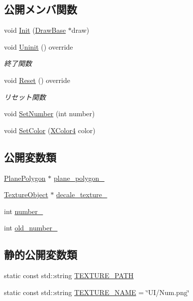\subsection*{公開メンバ関数}
\begin{DoxyCompactItemize}
\item 
void \mbox{\hyperlink{class_number_ad92c9038810d0f831fdb9b5b13901b79}{Init}} (\mbox{\hyperlink{class_draw_base}{Draw\+Base}} $\ast$draw)
\item 
void \mbox{\hyperlink{class_number_a7c3bf9c55f7a0a19d80129c5f07f99f2}{Uninit}} () override
\begin{DoxyCompactList}\small\item\em 終了関数 \end{DoxyCompactList}\item 
void \mbox{\hyperlink{class_number_a7c6facdb1b3d0acc8309e0a915863d44}{Reset}} () override
\begin{DoxyCompactList}\small\item\em リセット関数 \end{DoxyCompactList}\item 
void \mbox{\hyperlink{class_number_ac825b1ee1f46a6ac4ffd3bc904964745}{Set\+Number}} (int number)
\item 
void \mbox{\hyperlink{class_number_a1ea98cdee888a040f4530a6654657c44}{Set\+Color}} (\mbox{\hyperlink{_vector3_d_8h_a680c30c4a07d86fe763c7e01169cd6cc}{X\+Color4}} color)
\end{DoxyCompactItemize}
\subsection*{公開変数類}
\begin{DoxyCompactItemize}
\item 
\mbox{\hyperlink{class_plane_polygon}{Plane\+Polygon}} $\ast$ \mbox{\hyperlink{class_number_a588084d69c46b02ddb608448724cfe11}{plane\+\_\+polygon\+\_\+}}
\item 
\mbox{\hyperlink{class_texture_object}{Texture\+Object}} $\ast$ \mbox{\hyperlink{class_number_a305385aaec293089117c50fd1cf2575f}{decale\+\_\+texture\+\_\+}}
\item 
int \mbox{\hyperlink{class_number_a8c3235a3442303d4ef950fef5eb7b34c}{number\+\_\+}}
\item 
int \mbox{\hyperlink{class_number_acd5422010e99cbf61196094a9b501115}{old\+\_\+number\+\_\+}}
\end{DoxyCompactItemize}
\subsection*{静的公開変数類}
\begin{DoxyCompactItemize}
\item 
static const std\+::string \mbox{\hyperlink{class_number_a0018ed63d70f4dde3c64bf99df7978ce}{T\+E\+X\+T\+U\+R\+E\+\_\+\+P\+A\+TH}}
\item 
static const std\+::string \mbox{\hyperlink{class_number_a43c6583cef6d8d32b8de6683f80bdb59}{T\+E\+X\+T\+U\+R\+E\+\_\+\+N\+A\+ME}} = \char`\"{}UI/Num.\+png\char`\"{}
\end{DoxyCompactItemize}
